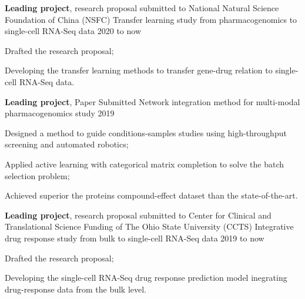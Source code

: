 
\begin{cventries}
  \cventry
    {\textbf{Leading project}, research proposal submitted to National Natural Science Foundation of China (NSFC)} %
    {Transfer learning study from pharmacogenomics to single-cell RNA-Seq data} %
    {} %
    {2020 to now} %
    {
      \begin{cvitems} %
        \item Drafted the research proposal; 
        \item Developing the transfer learning methods to transfer gene-drug relation to single-cell RNA-Seq data.
      \end{cvitems}
    }
  \cventry
    {\textbf{Leading project}, Paper Submitted} %
    {Network integration method for multi-modal pharmacogenomics study} %
    {} %
    {2019} %
    {
      \begin{cvitems} %
        \item Designed a method to guide conditions-samples studies using high-throughput screening and automated robotics;
        \item Applied active learning with categorical matrix completion to solve the batch selection problem;
        \item Achieved superior the proteins compound-effect dataset than the state-of-the-art.
      \end{cvitems}
    }
  \cventry
    {\textbf{Leading project}, research proposal submitted to Center for Clinical and Translational Science Funding of The Ohio State University (CCTS)} %
    {Integrative drug response study from bulk to single-cell RNA-Seq data} %
    {} %
    {2019 to now} %
    {
      \begin{cvitems} %
        \item Drafted the research proposal;
        \item Developing the single-cell RNA-Seq drug response prediction model inegrating drug-response data from the bulk level.
      \end{cvitems}
    }


\end{cventries}
